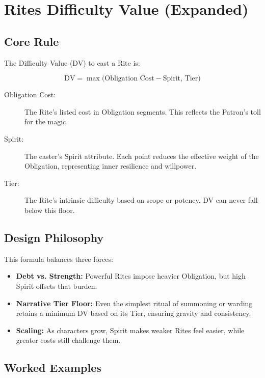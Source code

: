 \section{Rites Difficulty Value (Expanded)}
\label{sec:rites-dv-expanded}

\subsection*{Core Rule}

The Difficulty Value (DV) to cast a Rite is:

\[
\text{DV} = \max\!\big(\text{Obligation Cost} - \text{Spirit}, \, \text{Tier}\big)
\]

\begin{description}
  \item[Obligation Cost:] The Rite’s listed cost in Obligation segments. This reflects the Patron’s toll for the magic.
  \item[Spirit:] The caster’s Spirit attribute. Each point reduces the effective weight of the Obligation, representing inner resilience and willpower.
  \item[Tier:] The Rite’s intrinsic difficulty based on scope or potency. DV can never fall below this floor.
\end{description}

\subsection*{Design Philosophy}

This formula balances three forces:
\begin{itemize}
  \item \textbf{Debt vs. Strength:} Powerful Rites impose heavier Obligation, but high Spirit offsets that burden.
  \item \textbf{Narrative Tier Floor:} Even the simplest ritual of summoning or warding retains a minimum DV based on its Tier, ensuring gravity and consistency.
  \item \textbf{Scaling:} As characters grow, Spirit makes weaker Rites feel easier, while greater costs still challenge them.
\end{itemize}

\subsection*{Worked Examples}

